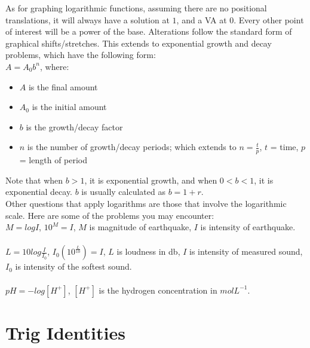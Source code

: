 \documentclass{article}
\begin{document}
As for graphing logarithmic functions, assuming there are no positional translations, it will always have a solution at $1$, and a VA at $0$. Every other point of interest will be a power of the base. Alterations follow the standard form of graphical shifts/stretches. This extends to exponential growth and decay problems, which have the following form: \\

$A = A_0b^n$, where: \begin{itemize}
    \item $A$ is the final amount
    \item $A_0$ is the initial amount
    \item $b$ is the growth/decay factor
    \item $n$ is the number of growth/decay periods; which extends to $n = \frac{t}{p}$, $t$ = time, $p$ = length of period
\end{itemize}

Note that when $b > 1$, it is exponential growth, and when $0 < b < 1$, it is exponential decay. $b$ is usually calculated as $b = 1 + r$. \\

Other questions that apply logarithms are those that involve the logarithmic scale. Here are some of the problems you may encounter: \\

$M = logI$, $10^M=I$, $M$ is magnitude of earthquake, $I$ is intensity of earthquake. \\ \\
$L = 10log\frac{I}{I_0}$, $I_0(10^\frac{L}{10}) = I$, $L$ is loudness in db, $I$ is intensity of measured sound, $I_0$ is intensity of the softest sound. \\ \\
$pH = -log[H^+]$, $[H^+]$ is the hydrogen concentration in $molL^{-1}$.

\section{Trig Identities}
\end{document}
